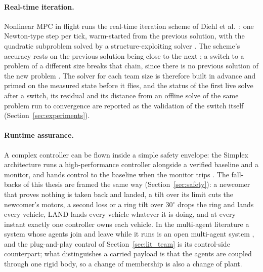 \paragraph{Real-time iteration.} Nonlinear MPC in flight runs the real-time iteration scheme of Diehl et al.\
\cite{diehl2002rti}: one Newton-type step per tick, warm-started from the previous solution, with the quadratic
subproblem solved by a structure-exploiting solver \cite{frison2020hpipm, verschueren2022acados}. The scheme's
accuracy rests on the previous solution being close to the next \cite{rawlings2017mpc}; a switch to a problem of a
different size breaks that chain, since there is no previous solution of the new problem \cite{gros2020rti}. The solver for each team size is therefore built in advance and
primed on the measured state before it flies, and the status of the first live solve after a switch, its
residual and its distance from an offline solve of the same problem run to convergence are reported as the
validation of the switch itself (Section~\ref{sec:experiments}).

\paragraph{Runtime assurance.} A complex controller can be flown inside a simple safety envelope: the Simplex
architecture runs a high-performance controller alongside a verified baseline and a monitor, and hands control to
the baseline when the monitor trips \cite{sha2001simplicity}. The fall-backs of this thesis are
framed the same way (Section~\ref{sec:safety}): a newcomer that proves nothing is taken back and landed, a tilt
over its limit cuts the newcomer's motors, a second loss or a ring tilt over 30$^\circ$ drops the ring and lands
every vehicle, LAND lands every vehicle whatever it is doing, and at every instant exactly one controller owns
each vehicle. In the multi-agent literature a system whose agents join and leave while it runs is an open
multi-agent system \cite{hendrickx2017open, sekercioglu2026open}, and
the plug-and-play control of Section~\ref{sec:lit_team} is its control-side counterpart; what distinguishes a
carried payload is that the agents are coupled through one rigid body, so a change of membership is also a change
of plant.
